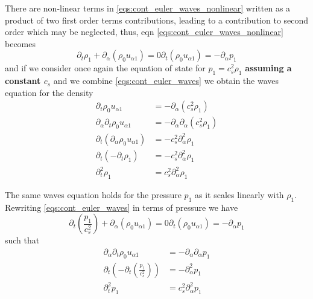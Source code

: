 There are non-linear terms in \ref{eqs:cont_euler_waves_nonlinear} written as a product of two first order terms contributions, leading to a contribution to second order which may be neglected, thus, eqn \ref{eqs:cont_euler_waves_nonlinear} becomes
\begin{subequations}\label{eqs:cont_euler_waves}
\begin{equation}\label{eq:continuity_linear}
    \partial_t\rho_1 + \partial_\alpha(\rho_0u_{\alpha1}) = 0
\end{equation}
\begin{equation}\label{eq:euler_linear}
    \partial_t(\rho_0u_{\alpha1}) = -\partial_\alpha p_1 
\end{equation}
\end{subequations}
and if we consider once again the equation of state for $p_1 = c_s^2\rho_1$ \textbf{assuming a constant $c_s$} and we combine \ref{eqs:cont_euler_waves} we obtain the waves equation for the density
\begin{align}
    \partial_t\rho_0u_{\alpha1} &= -\partial_\alpha\left(c_s^2\rho_1\right) \nonumber\\
    \partial_\alpha\partial_t\rho_0u_{\alpha1} &= -\partial_\alpha\partial_\alpha\left(c_s^2\rho_1\right) \nonumber\\
    \partial_t\left(\partial_\alpha\rho_0u_{\alpha1}\right) &= -c_s^2\partial_\alpha^2\rho_1 \nonumber\\
    \partial_t\left(-\partial_t\rho_1\right) &= -c_s^2\partial_\alpha^2\rho_1 \nonumber\\
    \partial_t^2\rho_1 &= c_s^2\partial_\alpha^2\rho_1\label{eq:proc_waves_rho}
\end{align}

The same waves equation holds for the pressure $p_1$ as it scales linearly with $\rho_1$. Rewriting \ref{eqs:cont_euler_waves} in terms of pressure we have
\begin{subequations}\label{eqs:cont_euler_waves}
\begin{equation}\label{eq:continuity_linear}
    \partial_t\left(\frac{p_1}{c_s^2}\right) + \partial_\alpha(\rho_0u_{\alpha1}) = 0
\end{equation}
\begin{equation}\label{eq:euler_linear}
    \partial_t(\rho_0u_{\alpha1}) = -\partial_\alpha p_1 
\end{equation}
\end{subequations}
such that 
\begin{align}
    \partial_\alpha\partial_t\rho_0u_{\alpha1} &= -\partial_\alpha\partial_\alpha p_1 \nonumber\\
    \partial_t\left(-\partial_t\left(\frac{p_1}{c_s^2}\right)\right) &= -\partial_\alpha^2 p_1 \nonumber\\
    \partial_t^2 p_1 &= c_s^2\partial_\alpha^2 p_1\label{eq:proc_waves_p}
\end{align}

